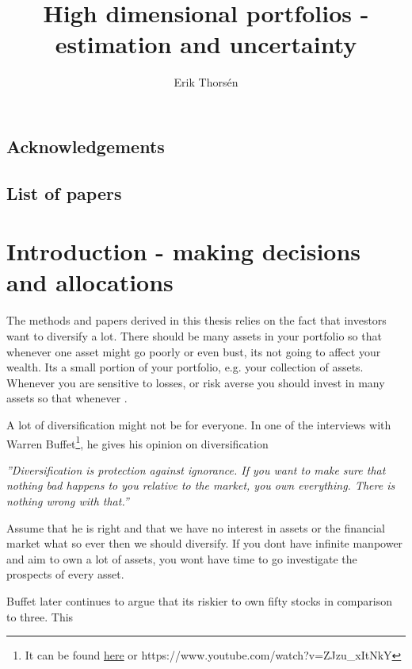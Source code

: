 \documentclass[]{book}
\title{High dimensional portfolios - estimation and uncertainty}
\author{Erik Thorsén}
\begin{document}
\maketitle

\section*{Acknowledgements}

\newpage
\section*{List of papers}

\tableofcontents
\chapter[Introduction]{Introduction - making decisions and allocations}\label{ch:intro}
The methods and papers derived in this thesis relies on the fact that investors want to diversify a lot. 
There should be many assets in your portfolio so that whenever one asset might go poorly or even bust, its not going to affect your wealth. 
Its a small portion of your portfolio, e.g. your collection of assets. 
Whenever you are sensitive to losses, or risk averse you should invest in many assets so that whenever .


A lot of diversification might not be for everyone. 
In one of the interviews with Warren Buffet\footnote{It can be found \hyperlink{https://www.youtube.com/watch?v=ZJzu_xItNkY}{here} or https://www.youtube.com/watch?v=ZJzu\_xItNkY}, he gives his opinion on diversification
\begin{center}
	\textit{''Diversification is protection against ignorance. If you want to make sure that nothing bad happens to you relative to the market, you own everything. There is nothing wrong with that.''}
\end{center}
Assume that he is right and that we have no interest in assets or the financial market what so ever then we should diversify.
If you dont have infinite manpower and aim to own a lot of assets, you wont have time to go investigate the prospects of every asset.

Buffet later continues to argue that its riskier to own fifty stocks in comparison to three.
This 
 
\end{document}
